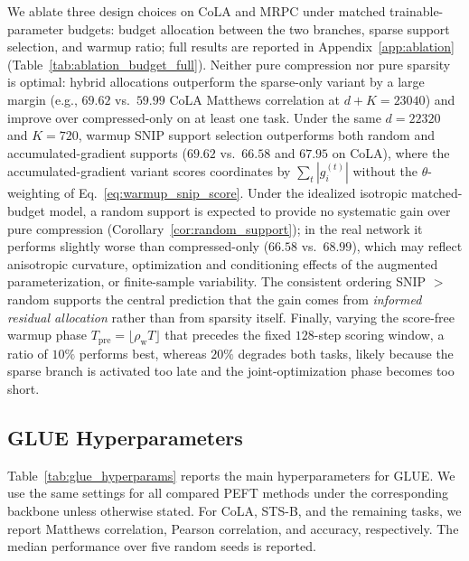 We ablate three design choices on CoLA and MRPC under matched trainable-parameter budgets: budget allocation between the two branches, sparse support selection, and warmup ratio; full results are reported in Appendix~\ref{app:ablation} (Table~\ref{tab:ablation_budget_full}).
Neither pure compression nor pure sparsity is optimal: hybrid allocations outperform the sparse-only variant by a large margin (e.g., $69.62$ vs.\ $59.99$ CoLA Matthews correlation at $d{+}K=23040$) and improve over compressed-only on at least one task.
Under the same $d=22320$ and $K=720$, warmup SNIP support selection outperforms both random and accumulated-gradient supports ($69.62$ vs.\ $66.58$ and $67.95$ on CoLA), where the accumulated-gradient variant scores coordinates by $\sum_t|g_i^{(t)}|$ without the $\theta$-weighting of Eq.~\eqref{eq:warmup_snip_score}.
Under the idealized isotropic matched-budget model, a random support is expected to provide no systematic gain over pure compression (Corollary~\ref{cor:random_support}); in the real network it performs slightly worse than compressed-only ($66.58$ vs.\ $68.99$), which may reflect anisotropic curvature, optimization and conditioning effects of the augmented parameterization, or finite-sample variability.
The consistent ordering SNIP $>$ random supports the central prediction that the gain comes from \emph{informed residual allocation} rather than from sparsity itself.
Finally, varying the score-free warmup phase $T_{\mathrm{pre}}=\lfloor\rho_{\mathrm{w}}T\rfloor$ that precedes the fixed $128$-step scoring window, a ratio of $10\%$ performs best, whereas $20\%$ degrades both tasks, likely because the sparse branch is activated too late and the joint-optimization phase becomes too short.


\subsection{GLUE Hyperparameters}

Table~\ref{tab:glue_hyperparams} reports the main hyperparameters for GLUE.
We use the same settings for all compared PEFT methods under the corresponding backbone unless otherwise stated.
For CoLA, STS-B, and the remaining tasks, we report Matthews correlation, Pearson correlation, and accuracy, respectively.
The median performance over five random seeds is reported.


